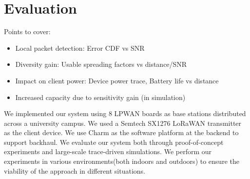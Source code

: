 \section{Evaluation}
\label{sec:eval}

{\color{blue} Points to cover:

\begin{itemize}
    \item Local packet detection: Error CDF vs SNR
    \item Diversity gain: Usable spreading factors vs distance/SNR
    \item Impact on client power: Device power trace, Battery life vs distance
    \item Increased capacity due to sensitivity gain (in simulation)
\end{itemize}
}

We implemented our system using 8 LPWAN boards as base stations
distributed across a university campus.  We used a Semtech SX1276 LoRaWAN
transmitter as the client device. We use Charm as the software platform at the
backend to support backhaul. We evaluate our system both through
proof-of-concept experiments and large-scale trace-driven simulations. We
perform our experiments in various environments(both indoors and outdoors) to
ensure the viability of the approach in different situations.